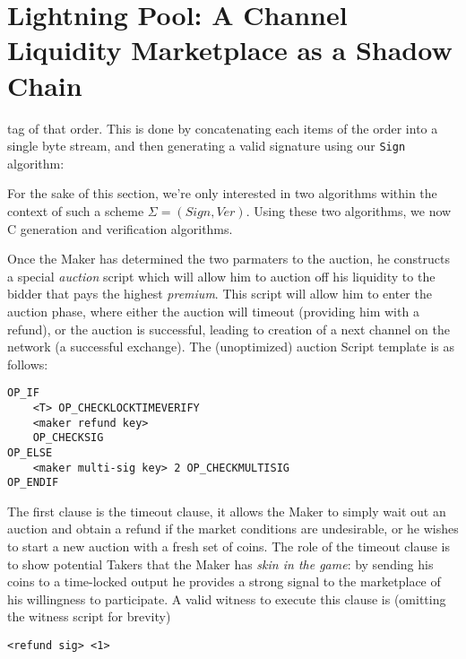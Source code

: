 \documentclass[12pt,a4paper]{article}
\theoremstyle{definition}
\begin{document}





\section{Lightning Pool: A Channel Liquidity Marketplace as a Shadow Chain}

tag of that order. This is done by concatenating each items of the order into
a single byte stream, and then generating a valid signature using our
\texttt{Sign} algorithm:




For the sake of this section, we're only
interested in two algorithms within the context of such a scheme $\Sigma =
(Sign, Ver)$. Using these two algorithms, we now C
generation and verification algorithms.


Once the Maker has determined the two parmaters to the auction, he constructs a special \emph{auction} script which will allow him to auction off his liquidity to the bidder that pays the highest \emph{premium}. This script will allow him to enter the auction phase, where either the auction will timeout (providing him with a refund), or the auction is successful, leading to creation of a next channel on the network (a successful exchange). The (unoptimized) auction Script template is as follows: 
\begin{verbatim}
OP_IF
    <T> OP_CHECKLOCKTIMEVERIFY
    <maker refund key> 
    OP_CHECKSIG
OP_ELSE
    <maker multi-sig key> 2 OP_CHECKMULTISIG
OP_ENDIF
\end{verbatim}
 
 The first clause is the timeout clause, it allows the Maker to simply wait out an auction and obtain a refund if the market conditions are undesirable, or he wishes to start a new auction with a fresh set of coins. The role of the timeout clause is to show potential Takers that the Maker has \emph{skin in the game}: by sending his coins to a time-locked output he provides a strong signal to the marketplace of his willingness to participate. A valid witness to execute this clause is (omitting the witness script for brevity) 
\begin{verbatim}
<refund sig> <1>
\end{verbatim}
\end{document}
